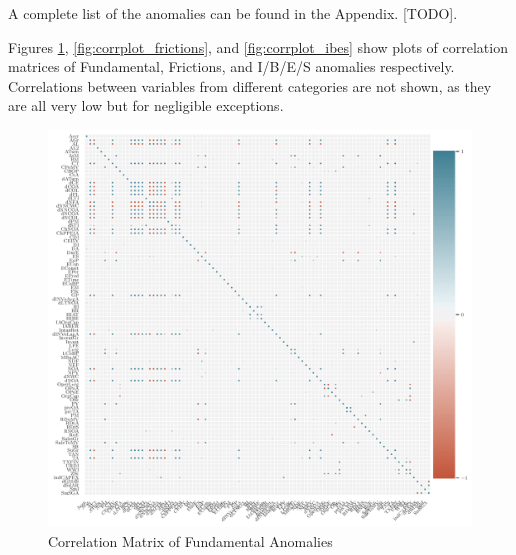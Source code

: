 A complete list of the anomalies can be found in the Appendix. [TODO]. 

Figures \ref{fig:corrplot_funds}, \ref{fig:corrplot_frictions}, and \ref{fig:corrplot_ibes} show plots of correlation matrices of Fundamental, Frictions, and I/B/E/S anomalies respectively. Correlations between variables from different categories are not shown, as they are all very low but for negligible exceptions. 


\begin{center}
	\begin{figure}
		\includegraphics[width=\textwidth,height=\textheight,keepaspectratio]{Figures/corrplot_funds.pdf}
		\caption{Correlation Matrix of Fundamental Anomalies}
		\label{fig:corrplot_funds}
	\end{figure}
\end{center}

